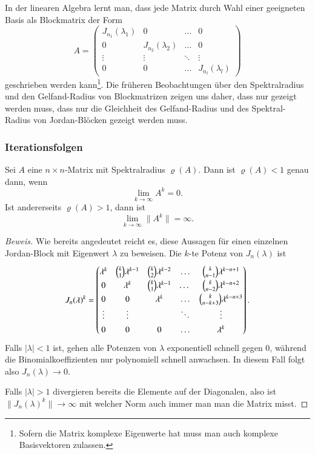 In der linearen Algebra lernt man, dass jede Matrix durch Wahl
%
einer geeigneten Basis als Blockmatrix der Form
\[
A
=
\begin{pmatrix}
J_{n_1}(\lambda_1) &        0         & \dots & 0 \\
       0         & J_{n_2}(\lambda_2) & \dots & 0 \\[-4pt]
\vdots           &\vdots            &\ddots &\vdots \\
       0         &        0         & \dots &J_{n_l}(\lambda_l)
\end{pmatrix}
\]
geschrieben werden kann\footnote{Sofern die Matrix komplexe Eigenwerte
hat muss man auch komplexe Basisvektoren zulassen.}.
Die früheren Beobachtungen über den Spektralradius und den
Gelfand-Radius von Blockmatrizen zeigen uns daher, dass
nur gezeigt werden muss, dass nur die Gleichheit des Gelfand-Radius
und des Spektral-Radius von Jordan-Blöcken gezeigt werden muss.

\subsubsection{Iterationsfolgen}
\begin{satz}
\label{buch:spektralradius:satz:grenzwert}
Sei $A$ eine $n\times n$-Matrix mit Spektralradius $\varrho(A)$.
Dann ist $\varrho(A)<1$ genau dann, wenn
\[
\lim_{k\to\infty} A^k = 0.
\]
Ist andererseits $\varrho(A) > 1$, dann ist
\[
\lim_{k\to\infty} \|A^k\|=\infty.
\]
\end{satz}

\begin{proof}[Beweis]
Wie bereits angedeutet reicht es, diese Aussagen für einen einzelnen
Jordan-Block mit Eigenwert $\lambda$ zu beweisen.
Die $k$-te Potenz von $J_n(\lambda)$ ist
\[
J_n(\lambda)^k
=
\renewcommand\arraystretch{1.35}
\begin{pmatrix}
\lambda^k    & \binom{k}{1} \lambda^{k-1} & \binom{k}{2}\lambda^{k-2}&\dots&
\binom{k}{n-1}\lambda^{k-n+1}\\
      0      &\lambda^k & \binom{k}{1} \lambda^{k-1} & \dots &\binom{k}{n-2}\lambda^{k-n+2}\\
      0     &      0    & \lambda^k & \dots &\binom{k}{n-k+3}\lambda^{k-n+3}\\
\vdots      & \vdots    &               &\ddots & \vdots\\
     0      &      0    &      0        &\dots  &\lambda^k
\end{pmatrix}.
\]
Falls $|\lambda| < 1$ ist, gehen alle Potenzen von $\lambda$ exponentiell
schnell gegen $0$, während die Binomialkoeffizienten nur polynomiell
schnell anwachsen. 
%
In diesem Fall folgt also $J_n(\lambda)\to 0$.

Falls $|\lambda| >1$ divergieren bereits die Elemente auf der Diagonalen,
also ist $\|J_n(\lambda)^k\|\to\infty$ mit welcher Norm auch immer man
man die Matrix misst.
\end{proof}

